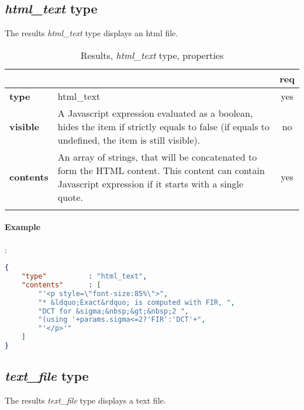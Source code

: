 \subsection{ \emph{html\_text} type}

The results \emph{html\_text} type displays an html file.

\begin{longtable}{|>{\bf}L{\linewidth}|L{\linewidth}|c|}
\hline
{}     &  & {\bf req} \tabularnewline 
\hline \hline
 type      & html\_text  & yes \\ \hline
 visible    & A Javascript expression evaluated as a boolean, hides the item if
              strictly equals to false (if equals to undefined, the item is still visible).& no \\ \hline
 contents  & An array of strings, that will be concatenated to form the HTML 
             content. This content can contain Javascript expression if it starts
            with a single quote. & yes \\ \hline
\caption{Results, \emph{html\_text} type, properties}
\end{longtable}

\paragraph{Example}:\\
\begin{lstlisting}[language=json,firstnumber=1]
{ 
    "type"          : "html_text", 
    "contents"      : [
        "'<p style=\"font-size:85%\">",
        "* &ldquo;Exact&rdquo; is computed with FIR, ",
        "DCT for &sigma;&nbsp;&gt;&nbsp;2 ",
        "(using '+params.sigma<=2?'FIR':'DCT'+",
        "'</p>'" 
    ] 
}
\end{lstlisting}


\subsection{ \emph{text\_file} type}

The results \emph{text\_file} type displays a text file.

